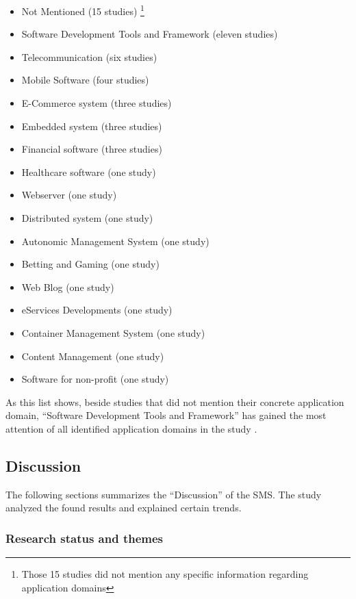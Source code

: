 \begin{itemize}
    \item Not Mentioned (15 studies) \footnote{Those 15 studies
              did not mention any specific information regarding application
              domains}
    \item Software Development Tools and Framework (eleven studies)
    \item Telecommunication (six studies)
    \item Mobile Software (four studies)
    \item E-Commerce system (three studies)
    \item Embedded system (three studies)
    \item Financial software (three studies)
    \item Healthcare software (one study)
    \item Webserver (one study)
    \item Distributed system (one study)
    \item Autonomic Management System (one study)
    \item Betting and Gaming (one study)
    \item Web Blog (one study)
    \item eServices Developments (one study)
    \item Container Management System (one study)
    \item Content Management (one study)
    \item Software for non-profit (one study)
\end{itemize}

As this list shows, beside studies that did not mention their concrete
application domain, ``Software Development Tools and Framework''
has gained the most attention of all identified application domains
in the study \cite{waseem:SMSMSADevOps}.

\subsection{Discussion}

The following sections summarizes the ``Discussion'' of the SMS. The study
analyzed the found results and explained certain trends.

\subsubsection{Research status and themes}

